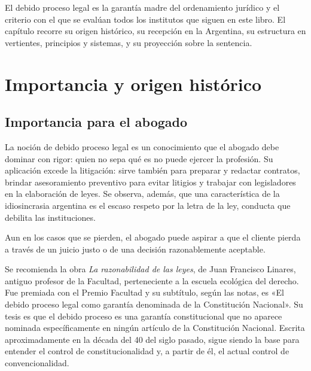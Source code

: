 \documentclass[12pt,oneside]{book}
\begin{document}
El debido proceso legal es la garantía madre del ordenamiento jurídico y el criterio con el que se evalúan todos los institutos que siguen en este libro. El capítulo recorre su origen histórico, su recepción en la Argentina, su estructura en vertientes, principios y sistemas, y su proyección sobre la sentencia.

\section{Importancia y origen histórico}

\subsection{Importancia para el abogado}

La noción de debido proceso legal es un conocimiento que el abogado debe dominar con rigor: quien no sepa qué es no puede ejercer la profesión. Su aplicación excede la litigación: sirve también para preparar y redactar contratos, brindar asesoramiento preventivo para evitar litigios y trabajar con legisladores en la elaboración de leyes. Se observa, además, que una característica de la idiosincrasia argentina es el escaso respeto por la letra de la ley, conducta que debilita las instituciones.

Aun en los casos que se pierden, el abogado puede aspirar a que el cliente pierda a través de un juicio justo o de una decisión razonablemente aceptable.

\begin{note}
Se recomienda la obra \textit{La razonabilidad de las leyes}, de Juan Francisco Linares, antiguo profesor de la Facultad, perteneciente a la escuela ecológica del derecho. %
Fue premiada con el Premio Facultad y su subtítulo, según las notas, es «El debido proceso legal como garantía denominada de la Constitución Nacional». %
Su tesis es que el debido proceso es una garantía constitucional que no aparece nominada específicamente en ningún artículo de la Constitución Nacional. Escrita aproximadamente en la década del 40 del siglo pasado, sigue siendo la base para entender el control de constitucionalidad y, a partir de él, el actual control de convencionalidad.
\end{note}
\end{document}
